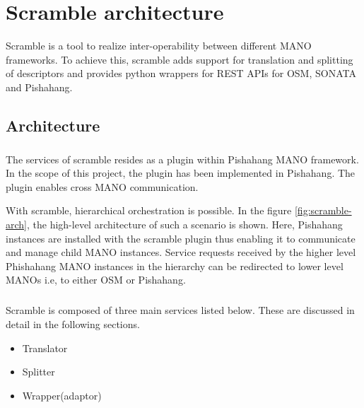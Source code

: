 \chapter{Scramble architecture}
\label{ch:Scramble architecture}

Scramble is a tool to realize inter-operability between different MANO frameworks. To achieve this, scramble adds support for translation and splitting of descriptors and provides python wrappers for REST APIs for OSM, SONATA and Pishahang.
\section{Architecture}
\paragraph{}
The services of scramble resides as a plugin within Pishahang MANO framework. In the scope of this project, the plugin has been implemented in Pishahang. The plugin enables cross MANO communication. 

With scramble, hierarchical orchestration is possible. In the figure \ref{fig:scramble-arch}, the high-level architecture of such a scenario is shown. Here, Pishahang instances are installed with the scramble plugin thus enabling it to communicate and manage child MANO instances. Service requests received by the higher level Phishahang MANO instances in the hierarchy can be redirected to lower level MANOs i.e, to either OSM or Pishahang.

\paragraph{}
Scramble is composed of three main services listed below. These are discussed in detail in the following sections.
\begin{itemize}
	\item Translator
	\item Splitter
	\item Wrapper(adaptor)
\end{itemize}


